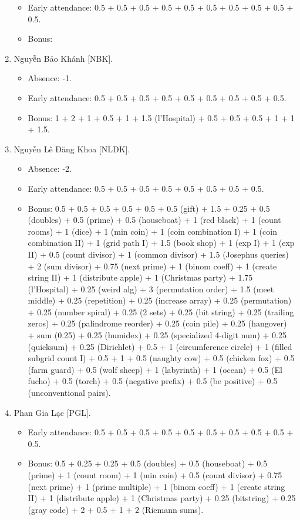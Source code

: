 \documentclass{article}
\begin{document}
\begin{enumerate}
\begin{itemize}
		\item Early attendance: 0.5 + 0.5 + 0.5 + 0.5 + 0.5 + 0.5 + 0.5 + 0.5 + 0.5 + 0.5.
		\item Bonus:
	\end{itemize}
	\item {\sc Nguyễn Bảo Khánh [NBK].}
	\begin{itemize}
        \item Absence: -1.
		\item Early attendance: 0.5 + 0.5 + 0.5 + 0.5 + 0.5 + 0.5 + 0.5 + 0.5 + 0.5.
		\item Bonus: 1 + 2 + 1 + 0.5 + 1 + 1.5 (l'Hospital) + 0.5 + 0.5 + 0.5 + 1 + 1 + 1.5.
	\end{itemize}
	\item {\sc Nguyễn Lê Đăng Khoa [NLDK].}
	\begin{itemize}
        \item Absence: -2.
		\item Early attendance: 0.5 + 0.5 + 0.5 + 0.5 + 0.5 + 0.5 + 0.5 + 0.5.
		\item Bonus: 0.5 + 0.5 + 0.5 + 0.5 + 0.5 + 0.5 (gift) + 1.5 + 0.25 + 0.5 (doubles) + 0.5 (prime) + 0.5 (houseboat) + 1 (red black) + 1 (count rooms) + 1 (dice) + 1 (min coin) + 1 (coin combination I) + 1 (coin combination II) + 1 (grid path I) + 1.5 (book shop) + 1 (exp I) + 1 (exp II) + 0.5 (count divisor) + 1 (common divisor) + 1.5 (Josephus queries) + 2 (sum divisor) + 0.75 (next prime) + 1 (binom coeff) + 1 (create string II) + 1 (distribute apple) + 1 (Christmas party) + 1.75 (l'Hospital) + 0.25 (weird alg) + 3 (permutation order) + 1.5 (meet middle) + 0.25 (repetition) + 0.25 (increase array) + 0.25 (permutation) + 0.25 (number spiral) + 0.25 (2 sets) + 0.25 (bit string) + 0.25 (trailing zeros) + 0.25 (palindrome reorder) + 0.25 (coin pile) + 0.25 (hangover) + sum (0.25) + 0.25 (humidex) + 0.25 (specialized 4-digit num) + 0.25 (quicksum) + 0.25 (Dirichlet) + 0.5 + 1 (circumference circle) + 1 (filled subgrid count I) + 0.5 + 1 + 0.5 (naughty cow) + 0.5 (chicken fox) + 0.5 (farm guard) + 0.5 (wolf sheep) + 1 (labyrinth) + 1 (ocean) + 0.5 (El fucho) + 0.5 (torch) + 0.5 (negative prefix) + 0.5 (be positive) + 0.5 (unconventional pairs).
	\end{itemize}
	\item {\sc Phan Gia Lạc [PGL].}
	\begin{itemize}
		\item Early attendance: 0.5 + 0.5 + 0.5 + 0.5 + 0.5 + 0.5 + 0.5 + 0.5 + 0.5 + 0.5.
		\item Bonus: 0.5 + 0.25 + 0.25 + 0.5 (doubles) + 0.5 (houseboat) + 0.5 (prime) + 1 (count room) + 1 (min coin) + 0.5 (count divisor) + 0.75 (next prime) + 1 (prime multiple) + 1 (binom coeff) + 1 (create string II) + 1 (distribute apple) + 1 (Christmas party) + 0.25 (bitstring) + 0.25 (gray code) + 2 + 0.5 + 1 + 2 (Riemann sums).

\end{itemize}
\end{enumerate}
\end{document}
